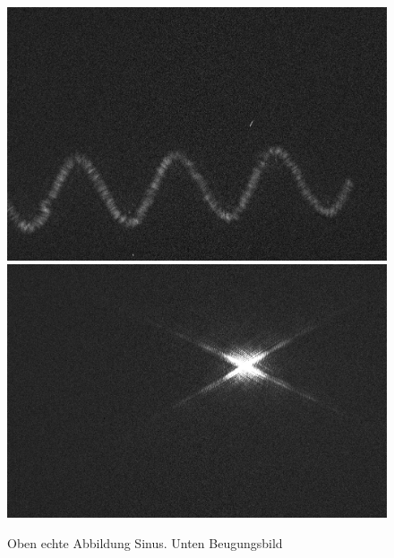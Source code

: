 \begin{figure}[h]
	\centering
	\includegraphics[width=\textwidth]{Daten/sin_1.jpg}
	\includegraphics[width=\textwidth]{Daten/sin_2.jpg}
	\caption[Aufnahme Sinus]{Oben echte Abbildung Sinus. Unten Beugungsbild}
\end{figure}
